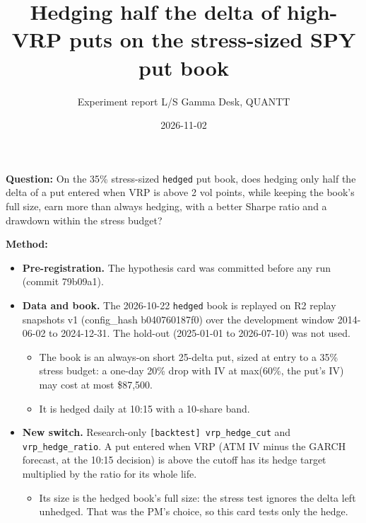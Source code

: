 \documentclass{article}
\title{Hedging half the delta of high-VRP puts on the stress-sized SPY put book}
\author{Experiment report \textperiodcentered{} L/S Gamma Desk, QUANTT}
\date{2026-11-02}
\begin{document}
\maketitle

\textbf{Question:} On the 35\% stress-sized \texttt{hedged} put book, does hedging only half the delta of a put entered when VRP is above 2 vol points, while keeping the book's full size, earn more than always hedging, with a better Sharpe ratio and a drawdown within the stress budget?

\textbf{Method:}

\begin{itemize}

\item \textbf{Pre-registration.} The hypothesis card was committed before any run (commit 79b09a1).

\item \textbf{Data and book.} The 2026-10-22 \texttt{hedged} book is replayed on R2 replay snapshots v1 (config\_hash b040760187f0) over the development window 2014-06-02 to 2024-12-31. The hold-out (2025-01-01 to 2026-07-10) was not used.

\begin{itemize}

\item The book is an always-on short 25-delta put, sized at entry to a 35\% stress budget: a one-day 20\% drop with IV at max(60\%, the put's IV) may cost at most \$87,500.

\item It is hedged daily at 10:15 with a 10-share band.

\end{itemize}

\item \textbf{New switch.} Research-only \texttt{[backtest] vrp\_\allowbreak{}hedge\_\allowbreak{}cut} and \texttt{vrp\_\allowbreak{}hedge\_\allowbreak{}ratio}. A put entered when VRP (ATM IV minus the GARCH forecast, at the 10:15 decision) is above the cutoff has its hedge target multiplied by the ratio for its whole life.

\begin{itemize}

\item Its size is the hedged book's full size: the stress test ignores the delta left unhedged. That was the PM's choice, so this card tests only the hedge.

\end{itemize}


\end{itemize}
\end{document}
